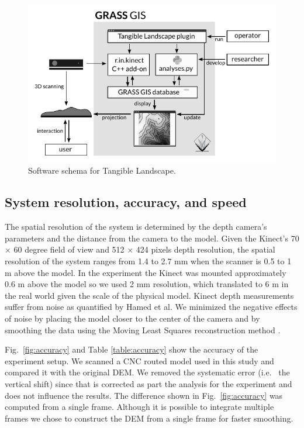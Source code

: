 \documentclass[prodmode,acmtochi]{acmsmall} %
\begin{document}
\begin{figure}
\begin{center}
		\includegraphics{images/software-schema.pdf}
	\caption{Software schema for Tangible Landscape.}
	\label{fig:software_schema}
\end{center}
\end{figure}

\subsection{System resolution, accuracy, and speed}
The spatial resolution of the system 
is determined by the depth camera's parameters
and the distance from the camera to the model. 
Given the Kinect's 70 $\times$ 60 degree field of view
and 512 $\times$ 424 pixels depth resolution, 
the spatial resolution of the system ranges from 1.4 to 2.7 mm
when the scanner is 0.5 to 1 m above the model. 
%
In the experiment the Kinect was mounted 
approximately 0.6 m above the model
so we used 2 mm resolution, which
translated to 6 m in the real world 
given the scale of the physical model.
Kinect depth measurements suffer from noise 
as quantified by Hamed et al. \cite{Hamed2015}
We minimized the negative effects of noise 
by placing the model
closer to the center of the camera 
and by smoothing the data using the Moving Least
Squares reconstruction method \cite{Rusu2011}.

Fig.~\ref{fig:accuracy} and Table \ref{table:accuracy} 
show the accuracy of the experiment setup.
We scanned a CNC routed model used in this study
and compared it with the original DEM.
We removed the systematic error (i.e.~ the vertical shift) 
since that is corrected 
as part the analysis for the experiment
and does not influence the results.
The difference shown in Fig.~\ref{fig:accuracy} 
was computed from a single frame. 
Although it is possible to integrate multiple frames
we chose to construct the DEM from a single frame 
for faster smoothing.
\end{document}
